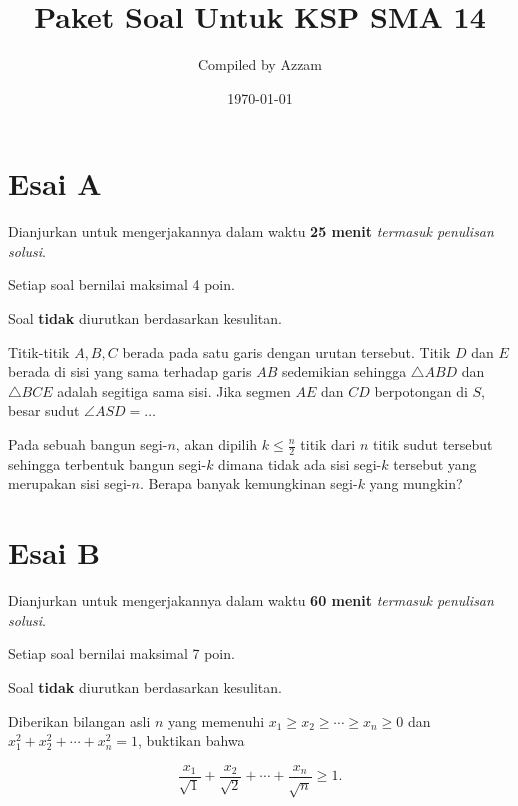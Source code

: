 \documentclass[12pt]{scrartcl}
\begin{document}
	\title{Paket Soal Untuk KSP SMA 14} %
	\date{\today}
	\author{Compiled by Azzam}
	\maketitle

\renewcommand*\contentsname{Daftar Isi}
\tableofcontents

\newpage
	

	\section{Esai A}
	Dianjurkan untuk mengerjakannya dalam waktu \textbf{25 menit} \textit{termasuk penulisan solusi}.
	
	Setiap soal bernilai maksimal 4 poin.
	
	Soal \textbf{tidak} diurutkan berdasarkan kesulitan. 
	
	\begin{soalbaru}
	Titik-titik $A,B,C$ berada pada satu garis dengan urutan tersebut. Titik $D$ dan $E$ berada di sisi yang sama terhadap garis $AB$ sedemikian sehingga $\triangle ABD$ dan $\triangle BCE$ adalah segitiga sama sisi. Jika segmen $AE$ dan $CD$ berpotongan di $S$, besar sudut $\angle ASD = \dots$
	\end{soalbaru}
	
	\begin{soalbaru}
	Pada sebuah bangun segi-$n$, akan dipilih $k \le \frac{n}{2}$ titik dari $n$ titik sudut tersebut sehingga terbentuk bangun segi-$k$ dimana tidak ada sisi segi-$k$ tersebut yang merupakan sisi segi-$n$. Berapa banyak kemungkinan segi-$k$ yang mungkin?
	\end{soalbaru}
	
	\section{Esai B}
	Dianjurkan untuk mengerjakannya dalam waktu \textbf{60 menit} \textit{termasuk penulisan solusi}.
	
	Setiap soal bernilai maksimal 7 poin.
		
	Soal \textbf{tidak} diurutkan berdasarkan kesulitan.
	
	\begin{soalbaru}
		Diberikan bilangan asli $n$ yang memenuhi $x_1 \ge x_2 \ge \cdots \ge x_n \ge 0$ dan $x_1^2+x_2^2+\cdots+x_n^2=1$, 
		buktikan bahwa
		
		$$\dfrac{x_1}{\sqrt{1}}+\dfrac{x_2}{\sqrt{2}}+\cdots+\dfrac{x_n}{\sqrt{n}}\ge 1.$$
	\end{soalbaru} 
	
\end{document}
